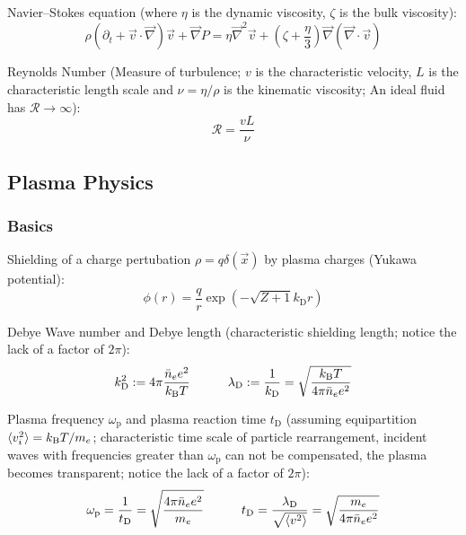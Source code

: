 			\noindent
			Navier--Stokes equation (where $\eta$ is the dynamic viscosity, $\zeta$ is the bulk viscosity):
			\begin{equation}
				\rho\left(\partial_{t}+\vec{v}\cdot\vec{\nabla}\right)\vec{v}+\vec{\nabla}P=\eta\vec{\nabla}^{2}\vec{v}+\left(\zeta+\frac{\eta}{3}\right)\vec{\nabla}\left(\vec{\nabla}\cdot\vec{v}\right)
			\end{equation}

			\noindent
			Reynolds Number (Measure of turbulence; $v$ is the characteristic velocity, $L$ is the characteristic length scale and $\nu = \eta / \rho$ is the kinematic viscosity; An ideal fluid has $\mathcal{R} \to \infty$):
			\begin{equation}
				\mathcal{R} = \frac{v L}{\nu}
			\end{equation}

	\subsection{Plasma Physics}
		\subsubsection{Basics}
			Shielding of a charge pertubation $\rho=q\delta(\vec{x})$ by plasma charges (Yukawa potential):
			\begin{equation}
				\phi(r) = \frac{q}{r} \exp(-\sqrt{Z+1}k_\text{D} r)
			\end{equation}

			\noindent
			Debye Wave number and Debye length (characteristic shielding length; notice the lack of a factor of $2\pi$):
			\begin{equation}
				k_\text{D}^2 := 4\pi \frac{\bar{n}_e e^2}{k_{\text{B}} T} \hspace{30pt}
				\lambda_\text{D} := \frac{1}{k_\text{D}} = \sqrt{\frac{k_{\text{B}} T}{4\pi \bar{n}_e e^2}}
			\end{equation}

			\noindent
			Plasma frequency $\omega_\text{p}$ and plasma reaction time $t_\text{D}$ (assuming equipartition $\langle v_i^2 \rangle = k_{\text{B}} T / m_e$; characteristic time scale of particle rearrangement, incident waves with frequencies greater than $\omega_\text{p}$ can not be compensated, the plasma becomes transparent; notice the lack of a factor of $2\pi$):
			\begin{equation}
				\omega_\text{p} = \frac{1}{t_\text{D}} = \sqrt{\frac{4\pi\bar{n}_e e^2}{m_e}} \hspace{30pt}
				t_\text{D} = \frac{\lambda_\text{D}}{\sqrt{\langle v^2 \rangle}} = \sqrt{\frac{m_e}{4\pi \bar{n}_e e^2}}
			\end{equation}

